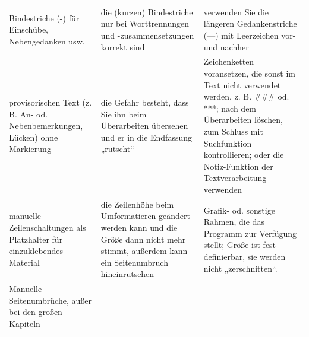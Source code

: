\documentclass[]{book}
\theoremstyle{definition}
\theoremstyle{definition}
\theoremstyle{definition}
\theoremstyle{remark}
\begin{document}
\begin{longtable}[]{@{}lll@{}}
\begin{minipage}[t]{0.13\columnwidth}
Bindestriche (-) für Einschübe, Nebengedanken usw.\strut
\end{minipage} & \begin{minipage}[t]{0.41\columnwidth}\raggedright\strut
die (kurzen) Bindestriche nur bei Worttrennungen und -zusammensetzungen
korrekt sind\strut
\end{minipage} & \begin{minipage}[t]{0.38\columnwidth}\raggedright\strut
verwenden Sie die längeren Gedankenstriche (---) mit Leerzeichen vor-
und nachher \vspace{-6mm}\strut
\end{minipage}\tabularnewline
\begin{minipage}[t]{0.13\columnwidth}\raggedright\strut
provisorischen Text (z. B. An- od. Nebenbemerkungen, Lücken) ohne
Markierung\strut
\end{minipage} & \begin{minipage}[t]{0.41\columnwidth}\raggedright\strut
die Gefahr besteht, dass Sie ihn beim Überarbeiten übersehen und er in
die Endfassung „rutscht``\strut
\end{minipage} & \begin{minipage}[t]{0.38\columnwidth}\raggedright\strut
Zeichenketten voransetzen, die sonst im Text nicht verwendet werden, z.
B. \#\#\# od. ***; nach dem Überarbeiten löschen, zum Schluss mit
Suchfunktion kontrollieren; oder die Notiz-Funktion der Textverarbeitung
verwenden \vspace{-6mm}\strut
\end{minipage}\tabularnewline
\begin{minipage}[t]{0.13\columnwidth}\raggedright\strut
manuelle Zeilenschaltungen als Platzhalter für einzuklebendes
Material\strut
\end{minipage} & \begin{minipage}[t]{0.41\columnwidth}\raggedright\strut
die Zeilenhöhe beim Umformatieren geändert werden kann und die Größe
dann nicht mehr stimmt, außerdem kann ein Seitenumbruch
hineinrutschen\strut
\end{minipage} & \begin{minipage}[t]{0.38\columnwidth}\raggedright\strut
Grafik- od. sonstige Rahmen, die das Programm zur Verfügung stellt;
Größe ist fest definierbar, sie werden nicht „zerschnitten``.
\vspace{-6mm}\strut
\end{minipage}\tabularnewline
\begin{minipage}[t]{0.13\columnwidth}\raggedright\strut
Manuelle Seitenumbrüche, außer bei den großen Kapiteln\strut

\end{minipage}
\end{longtable}
\end{document}
